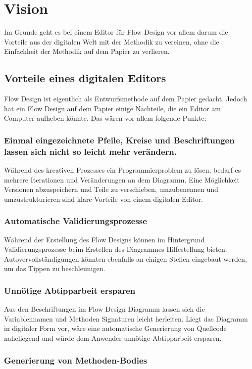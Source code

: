 
\section{Vision}

Im Grunde geht es bei einem Editor für Flow Design vor allem darum die Vorteile aus der digitalen Welt mit
der Methodik zu vereinen, ohne die Einfachheit der Methodik auf dem Papier zu
verlieren. 

\subsection{Vorteile eines digitalen Editors}

Flow Design ist eigentlich als Entwurfsmethode auf dem Papier gedacht.
Jedoch hat ein Flow Design auf dem Papier einige Nachteile, die ein Editor am
Computer aufheben könnte. Das wären vor allem folgende Punkte:
\subsubsection{Einmal eingezeichnete Pfeile, Kreise und Beschriftungen lassen sich nicht so leicht mehr verändern.}

Während des kreativen Prozesses ein Programmierproblem zu lösen, bedarf es
mehrere Iterationen und Veränderungen an dem Diagramm. Eine Möglichkeit Versionen
abzuspeichern und Teile zu verschieben, umzubenennen und umzustrukturieren sind
klare Vorteile von einem digitalen Editor.
\subsubsection{Automatische Validierungsprozesse}

Während der Erstellung des Flow Designs können im Hintergrund
Validierungsprozesse beim Erstellen des Diagrammes Hilfestellung bieten.
Autovervollständigungen könnten ebenfalls an einigen Stellen eingebaut werden,
um das Tippen zu beschleunigen.
\subsubsection{Unnötige Abtipparbeit ersparen}

Aus den Beschriftungen im Flow Design Diagramm lassen sich die Variablennamen und
Methoden Signaturen leicht herleiten. Liegt das Diagramm in digitaler Form vor,
wäre eine automatische Generierung von Quellcode naheliegend und
würde dem Anwender unnötige Abtipparbeit ersparen.
\subsubsection{Generierung von Methoden-Bodies}

